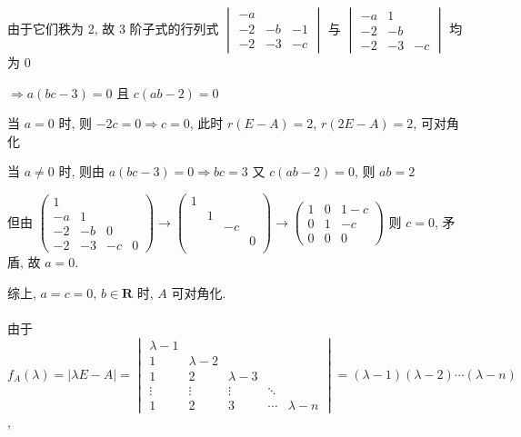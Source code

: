 		 由于它们秩为 2, 故 3 阶子式的行列式 \( \begin{vmatrix}
			 -a &    &    \\
			 -2 & -b & -1 \\
			 -2 & -3 & -c
		 \end{vmatrix} \) 与 \( \begin{vmatrix}
			 -a & 1  &     \\
			 -2 & -b &     \\
			 -2 & -3 & - c
		 \end{vmatrix} \) 均为 0

		 \( \Rightarrow a(bc - 3) = 0 \) 且 \( c(ab - 2) = 0 \)

		 当 \( a = 0 \) 时, 则 \( -2c = 0 \Rightarrow c = 0 \), 此时 \( r(E - A) = 2 \), \( r(2E - A) = 2 \), 可对角化

		 当 \( a \neq 0 \) 时, 则由 \( a(bc - 3) = 0 \Rightarrow bc = 3 \) 又 \( c(ab - 2) = 0 \), 则 \( ab = 2 \)

		 但由 \( \begin{pmatrix}
			 1  &    &    &   \\
			 -a & 1  &    &   \\
			 -2 & -b & 0  &   \\
			 -2 & -3 & -c & 0
		 \end{pmatrix} \rightarrow
		 \begin{pmatrix}
			 1 &   &    &   \\
			   & 1 &    &   \\
			   &   & -c &   \\
			   &   &    & 0 \\
		 \end{pmatrix}
		 \rightarrow
		 \begin{pmatrix}
			 1 & 0 & 1 - c \\
			 0 & 1 & -c    \\
			 0 & 0 & 0
		 \end{pmatrix} \) 则 \( c = 0 \), 矛盾, 故 \( a = 0 \).

		 综上, \( a = c = 0 \), \( b \in \mathbf{R} \) 时, \( A \) 可对角化.


	 \paragraph{} %
		 由于 \( f_{A}(\lambda) = |\lambda E - A| = \begin{vmatrix}
			 \lambda-1 &           &           &                    \\
			 1         & \lambda-2 &           &                    \\
			 1         & 2         & \lambda-3 &                    \\
			 \vdots    & \vdots    & \vdots    & \ddots             \\
			 1         & 2         & 3         & \cdots & \lambda-n
		 \end{vmatrix} = (\lambda - 1)(\lambda - 2)\cdots(\lambda - n) \),

